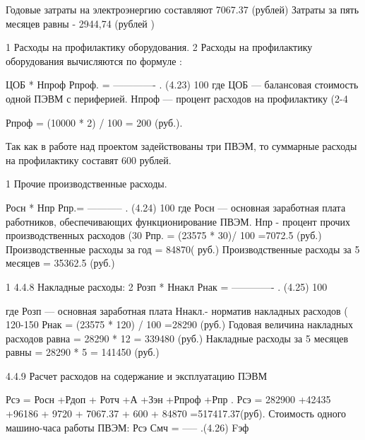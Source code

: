 \begin{ESKDexplanation}
\begin{ESKDexplanation}
\begin{ESKDexplanation}
\begin{ESKDexplanation}
Годовые  затраты на электроэнергию  составляют 7067.37  (рублей) 
Затраты за пять месяцев равны  - 2944,74 (рублей )


	1	Расходы на профилактику оборудования.
	2	
Расходы на профилактику оборудования вычисляются по формуле :

                                             ЦОБ *  Нпроф
                              Рпроф. = -------------       .                                                        (4.23)                    
                                                  100%
где ЦОБ — балансовая стоимость одной ПЭВМ с периферией.
Нпроф — процент расходов на профилактику   (2-4%

                              Рпроф = (10000 * 2) / 100  = 200 (руб.). 

Так как в работе над проектом задействованы три ПВЭМ, то суммарные
 расходы на профилактику составят 600 рублей.

	1	Прочие производственные расходы.

                                                         Росн * Нпр
                                            Рпр.=    -----------  .                                                    (4.24)
                                                             100%
где Росн — основная заработная плата работников, обеспечивающих 
функционирование ПВЭМ.
Нпр -       процент прочих производственных расходов (30%
Рпр. =  (23575 * 30)/ 100 =7072.5 (руб.)
Производственные расходы за год =  84870( руб.)
Производственные расходы за 5 месяцев = 35362.5 (руб.)

	1	4.4.8   Накладные расходы:
	2	
                                                      Розп * Ннакл
                                          Рнак = -------------  .                                                               (4.25)            
                                                           100

где Розп — основная заработная плата   
Ннакл.- норматив накладных расходов ( 120-150%
Рнак = (23575 * 120) / 100 =28290 (руб.)
Годовая величина накладных расходов равна = 28290 * 12 = 339480 (руб.)
Накладные расходы за 5 месяцев равны = 28290 * 5 = 141450 (руб.)

4.4.9    Расчет расходов на содержание и эксплуатацию ПЭВМ

Рсэ = Росн +Рдоп + Ротч +А +Зэн +Рпроф +Рпр .
Рсэ = 282900 +42435 +96186 + 9720 + 7067.37 + 600 + 84870 =517417.37(руб).
Стоимость одного машино-часа работы ПВЭМ: 
                                                   Рсэ
                                         Смч = -----                                                                   .(4.26)
                                                     Fэф


\end{ESKDexplanation}
\end{ESKDexplanation}
\end{ESKDexplanation}
\end{ESKDexplanation}
